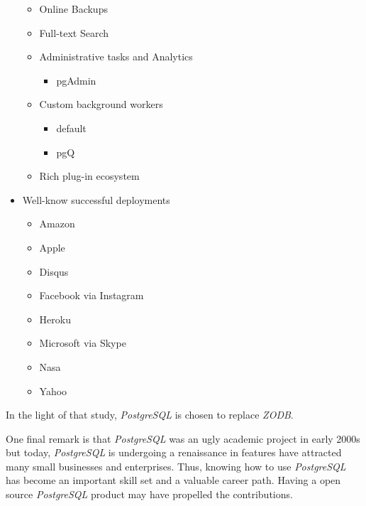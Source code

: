 \begin{itemize}
\begin{itemize}
	\item Online Backups
	\item Full-text Search
	\item Administrative tasks and Analytics
	\begin{itemize}
	  \item pgAdmin
	\end{itemize}
    \item Custom background workers
	\begin{itemize}
	  \item default
	  \item pgQ
	\end{itemize}
	\item Rich plug-in ecosystem
  \end{itemize}
  \item Well-know successful deployments
  \begin{itemize}
    \item Amazon
    \item Apple
    \item Disqus
    \item Facebook via Instagram
    \item Heroku
    \item Microsoft via Skype
    \item Nasa
    \item Yahoo
  \end{itemize}
\end{itemize}

In the light of that study, \textit{PostgreSQL} is chosen to replace \textit{ZODB}.

One final remark is that \textit{PostgreSQL} was an ugly academic project in early 2000s but today, \textit{PostgreSQL} is undergoing a renaissance in features have attracted many small businesses and enterprises. Thus, knowing how to use \textit{PostgreSQL} has become an important skill set and a valuable career path. Having a open source \textit{PostgreSQL} product may have propelled the contributions.